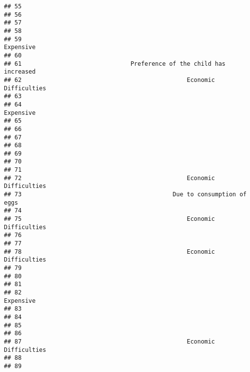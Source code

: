 \documentclass[
]{article}
\begin{document}
\begin{verbatim}
## 55                                                                     
## 56                                                                     
## 57                                                                     
## 58                                                                     
## 59                                                           Expensive 
## 60                                                                     
## 61                               Preference of the child has increased 
## 62                                               Economic Difficulties 
## 63                                                                     
## 64                                                           Expensive 
## 65                                                                     
## 66                                                                     
## 67                                                                     
## 68                                                                     
## 69                                                                     
## 70                                                                     
## 71                                                                     
## 72                                               Economic Difficulties 
## 73                                           Due to consumption of eggs
## 74                                                                     
## 75                                               Economic Difficulties 
## 76                                                                     
## 77                                                                     
## 78                                               Economic Difficulties 
## 79                                                                     
## 80                                                                     
## 81                                                                     
## 82                                                           Expensive 
## 83                                                                     
## 84                                                                     
## 85                                                                     
## 86                                                                     
## 87                                               Economic Difficulties 
## 88                                                                     
## 89                                                                     

\end{verbatim}
\end{document}
